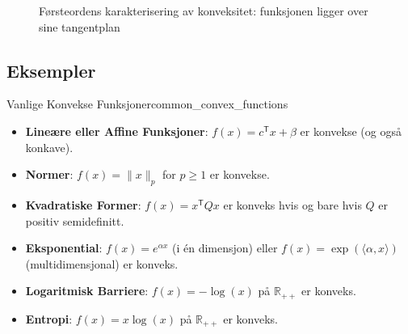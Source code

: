 \begin{figure}[htb]
  \centering
  \caption{Førsteordens karakterisering av konveksitet: funksjonen ligger over sine tangentplan}
  \label{fig:first_order}
\end{figure}

\subsection{Eksempler}
\begin{example}{Vanlige Konvekse Funksjoner}{common_convex_functions}
  \begin{itemize}
    \item \textbf{Lineære eller Affine Funksjoner}: $f(x) = c^\mathsf{T} x + \beta$ er konvekse (og også konkave).
    \item \textbf{Normer}: $f(x) = \|x\|_p$ for $p \geq 1$ er konvekse.
    \item \textbf{Kvadratiske Former}: $f(x) = x^\mathsf{T} Q x$ er konveks hvis og bare hvis $Q$ er positiv semidefinitt.
    \item \textbf{Eksponential}: $f(x) = e^{\alpha x}$ (i én dimensjon) eller $f(x)= \exp(\langle \alpha, x \rangle)$ (multidimensjonal) er konveks.
    \item \textbf{Logaritmisk Barriere}: $f(x) = -\log(x)$ på $\mathbb{R}_{++}$ er konveks.
    \item \textbf{Entropi}: $f(x) = x\log(x)$ på $\mathbb{R}_{++}$ er konveks.
  \end{itemize}
\end{example}

